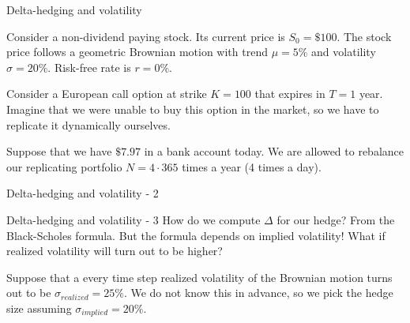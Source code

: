 \documentclass{beamer}
\begin{document}
\begin{frame}{Delta-hedging and volatility}

\justify
Consider a non-dividend paying stock. Its current price is $S_0=\$100$. The stock price follows a geometric Brownian motion with trend $\mu=5\%$ and volatility $\sigma=20\%$. Risk-free rate is $r=0\%$.

\justify
Consider a European call option at strike $K=100$ that expires in $T=1$ year. Imagine that we were unable to buy this option in the market, so we have to replicate it dynamically ourselves.

\justify
Suppose that we have $\$7.97$ in  a bank account today. We are allowed to rebalance our replicating portfolio $N=4 \cdot 365$ times a year (4 times a day).

\end{frame}




\begin{frame}{Delta-hedging and volatility - 2}
\centering
{}
\end{frame}



\begin{frame}{Delta-hedging and volatility - 3}
\justify
How do we compute $\Delta$ for our hedge? From the Black-Scholes formula. But the formula depends on 
\alert{implied} volatility! What if \alert{realized} volatility will turn out to be higher?

\justify
Suppose that a every time step realized volatility of the Brownian motion turns out to be $\sigma_{realized}=25\%$. We do not know this in advance, so we pick the hedge size assuming $\sigma_{implied}=20\%$. 
\end{frame}
\end{document}
